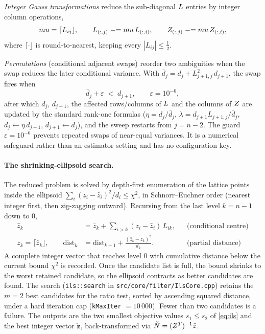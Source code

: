 \documentclass[main.tex]{subfiles}
\begin{document}
\emph{Integer Gauss transformations} reduce the sub-diagonal $L$
entries by integer column operations,
\begin{equation}
mu = \lceil L_{ij} \rfloor,
\qquad
L_{(:,j)} \mathrel{-}= mu\,L_{(:,i)},
\qquad
Z_{(:,j)} \mathrel{-}= mu\,Z_{(:,i)},
\label{eq:gauss}
\end{equation}
where $\lceil\cdot\rfloor$ is round-to-nearest, keeping every
$|L_{ij}| \le \tfrac12$.

\emph{Permutations} (conditional adjacent swaps) reorder two ambiguities
when the swap reduces the later conditional variance.  With
$\bar{d}_j = d_j + L_{j+1,j}^2\,d_{j+1}$, the swap fires when
\begin{equation}
\bar{d}_j + \varepsilon \;<\; d_{j+1},
\qquad \varepsilon = 10^{-6},
\label{eq:perm-test}
\end{equation}
after which $d_j,\,d_{j+1}$, the affected rows/columns of $L$ and
the columns of $Z$ are updated by the standard rank-one formulas
($\eta = d_j/\bar{d}_j$, $\lambda = d_{j+1}L_{j+1,j}/\bar{d}_j$,
$d_j \leftarrow \eta\,d_{j+1}$, $d_{j+1} \leftarrow \bar{d}_j$), and the
sweep restarts from $j = n-2$.  The guard $\varepsilon = 10^{-6}$
prevents repeated swaps of near-equal variances.  It is a numerical
safeguard rather than an estimator setting and has no configuration key.

\paragraph{The shrinking-ellipsoid search.}
The reduced problem is solved by depth-first enumeration of the lattice
points inside the ellipsoid $\sum_i (z_i - \hat{z}_i)^2 / d_i \le
\chi^2$, in \mbox{Schnorr--Euchner} order (nearest integer first, then
zig-zagging outward).  Recursing from the last level $k = n-1$ down to
$0$,
\begin{align}
\hat{z}_k &= \bar{z}_k + \sum_{i>k}(z_i - \hat{z}_i)\,L_{ik},
  &&\text{(conditional centre)} \label{eq:cond}\\
z_k = \lceil \hat{z}_k \rfloor,
\qquad
\mathrm{dist}_k &= \mathrm{dist}_{k+1}
  + \frac{(\hat{z}_k - z_k)^2}{d_k}.
  &&\text{(partial distance)} \label{eq:dist}
\end{align}
A complete integer vector that reaches level $0$ with cumulative
distance below the current bound $\chi^2$ is recorded.  Once the
candidate list is full, the bound shrinks to the worst retained
candidate, so the ellipsoid contracts as better candidates are found.
The search (\texttt{ils::search} in
\texttt{src/core/filter/IlsCore.cpp}) retains the $m = 2$ best
candidates for the ratio test, sorted by ascending squared distance,
under a hard iteration cap (\texttt{kMaxIter} $= 10\,000$).  Fewer than
two candidates is a failure.  The outputs are the two smallest objective
values $s_1 \le s_2$ of \eqref{eq:ils} and the best integer vector
$\check{\bm{z}}$, back-transformed via
$\check{N} = (Z^{T})^{-1}\check{z}$.
\end{document}
